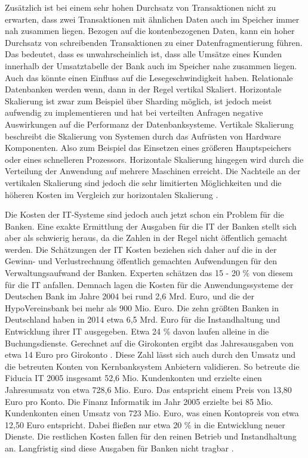 \documentclass[12pt,oneside,a4paper,parskip]{scrbook}
\begin{document}
Zusätzlich ist bei einem sehr hohen Durchsatz von Transaktionen nicht zu erwarten, dass zwei Transaktionen mit ähnlichen Daten auch im Speicher immer nah zusammen liegen. Bezogen auf die kontenbezogenen Daten, kann ein hoher Durchsatz von schreibenden Transaktionen zu einer Datenfragmentierung führen. Das bedeutet, dass es unwahrscheinlich ist, dass alle Umsätze eines Kunden innerhalb der Umsatztabelle der Bank auch im Speicher nahe zusammen liegen. Auch das könnte einen Einfluss auf die Lesegeschwindigkeit haben. Relationale Datenbanken werden wenn, dann in der Regel vertikal Skaliert. Horizontale Skalierung ist zwar zum Beispiel über Sharding möglich, ist jedoch meist aufwendig zu implementieren und hat bei verteilten Anfragen negative Auswirkungen auf die Performanz der Datenbanksysteme. Vertikale Skalierung beschreibt die Skalierung von Systemen durch das Aufrüsten von Hardware Komponenten. Also zum Beispiel das Einsetzen eines größeren Hauptspeichers oder eines schnelleren Prozessors. Horizontale Skalierung hingegen wird durch die Verteilung der Anwendung auf mehrere Maschinen erreicht. Die Nachteile an der vertikalen Skalierung sind jedoch die sehr limitierten Möglichkeiten und die höheren Kosten im Vergleich zur horizontalen Skalierung \cite{sharding}\cite{rdbmssuck}. 

Die Kosten der IT-Systeme sind jedoch auch jetzt schon ein Problem für die Banken. Eine exakte Ermittlung der Ausgaben für die IT der Banken stellt sich aber als schwierig heraus, da die Zahlen in der Regel nicht öffentlich gemacht werden. Die Schätzungen der IT Kosten beziehen sich daher auf die in der Gewinn- und Verlustrechnung öffentlich gemachten Aufwendungen für den Verwaltungsaufwand der Banken. Experten schätzen das 15 - 20 \% von diesem für die IT anfallen. Demnach lagen die Kosten für die Anwendungssysteme der Deutschen Bank im Jahre 2004 bei rund 2,6 Mrd. Euro, und die der HypoVereinsbank bei mehr als 900 Mio. Euro. Die zehn größten Banken in Deutschland haben in 2014 etwa 6,5 Mrd. Euro für die Instandhaltung und Entwicklung ihrer IT ausgegeben. 
Etwa 24 \% davon laufen alleine in die Buchungsdienste. Gerechnet auf die Girokonten ergibt das Jahresausgaben von etwa 14 Euro pro Girokonto \cite[29-39]{ITidF}. Diese Zahl lässt sich auch durch den Umsatz und die betreuten Konten von Kernbanksystem Anbietern validieren. So betreute die Fiducia IT 2005 insgesamt 52,6 Mio. Kundenkonten und erzielte einen Jahresumsatz von etwa 728,6 Mio. Euro. Das entspricht einem Preis von 13,80 Euro pro Konto. Die Finanz Informatik im Jahr 2005 erzielte bei 85 Mio. Kundenkonten einen Umsatz von 723 Mio. Euro, was einen Kontopreis von etwa 12,50 Euro entspricht. Dabei fließen nur etwa 20 \% in die Entwicklung neuer Dienste. Die restlichen Kosten fallen für den reinen Betrieb und Instandhaltung an. Langfristig sind diese Ausgaben für Banken nicht tragbar \cite[75-91]{ITidF}\cite{SuPdIiB}\cite[41-42]{DdF}\cite{bankingsCosts}. 
\end{document}
